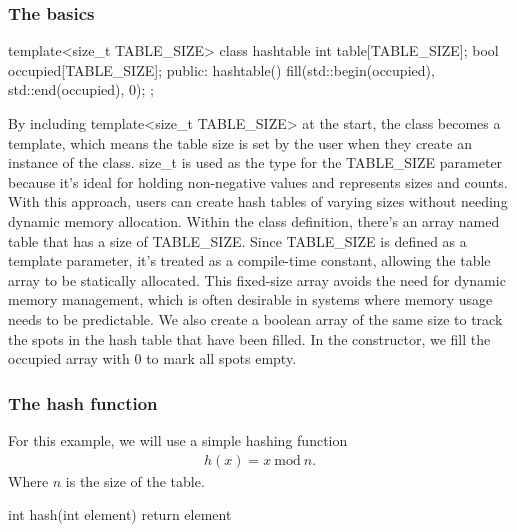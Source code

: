 \documentclass{report}
\begin{document}
\subsubsection{The basics}
\bigbreak \noindent 
\begin{cppcode}
template<size_t TABLE_SIZE>
class hashtable {
    int table[TABLE_SIZE];
    bool occupied[TABLE_SIZE]; 
public:
    hashtable() {
        fill(std::begin(occupied), std::end(occupied), 0);
    }
};
\end{cppcode}
\bigbreak \noindent 
By including template<size\_t TABLE\_SIZE> at the start, the class becomes a template, which means the table size is set by the user when they create an instance of the class. size\_t is used as the type for the TABLE\_SIZE parameter because it's ideal for holding non-negative values and represents sizes and counts. With this approach, users can create hash tables of varying sizes without needing dynamic memory allocation.
\bigbreak \noindent 
Within the class definition, there’s an array named table that has a size of TABLE\_SIZE. Since TABLE\_SIZE is defined as a template parameter, it’s treated as a compile-time constant, allowing the table array to be statically allocated. This fixed-size array avoids the need for dynamic memory management, which is often desirable in systems where memory usage needs to be predictable.
\bigbreak \noindent 
We also create a boolean array of the same size to track the spots in the hash table that have been filled. In the constructor, we fill the occupied array with 0 to mark all spots empty.
\bigbreak \noindent 
\subsubsection{The hash function}
\bigbreak \noindent 
For this example, we will use a simple hashing function
\begin{align*}
    h(x) = x \ \text{mod} \ n
.\end{align*}
Where $n$ is the size of the table.
\bigbreak \noindent 
\begin{cppcode}
    int hash(int element) {
        return element %
    }
\end{cppcode}

\pagebreak \bigbreak \noindent 
\end{document}
